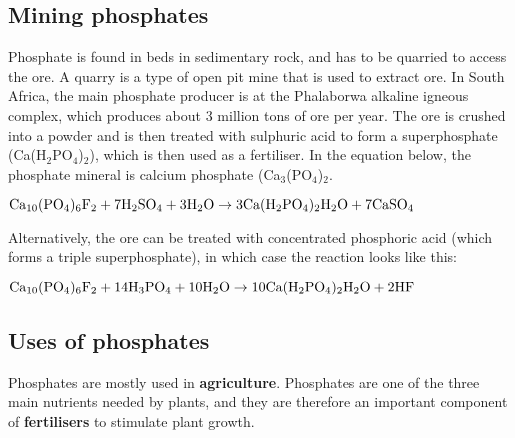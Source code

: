 \subsection{Mining phosphates}

Phosphate is found in beds in sedimentary rock, and has to be quarried to access the ore. A quarry is a type of open pit mine that is used to extract ore. In South Africa, the main phosphate producer is at the Phalaborwa alkaline igneous complex, which produces about 3 million tons of ore per year. The ore is crushed into a powder and is then treated with sulphuric acid to form a superphosphate (Ca(H$_{2}$PO$_{4}$)$_{2}$), which is then used as a fertiliser. In the equation below, the phosphate mineral is calcium phosphate (Ca$_{3}$(PO$_{4}$)$_{2}$.

\begin{center}
$\rm{Ca_{10}(PO_{4})_{6}F_{2} + 7H_{2}SO_{4} + 3H_{2}O \rightarrow 3Ca(H_{2}PO_{4})_{2}H_{2}O + 7CaSO_{4}}$
\end{center}

Alternatively, the ore can be treated with concentrated phosphoric acid (which forms a triple superphosphate), in which case the reaction looks like this:

\begin{center}
$\rm{Ca_{10}(PO_{4})_{6}F_{2} + 14H_{3}PO_{4} + 10H_{2}O \rightarrow 10Ca(H_{2}PO_{4})_{2}H_{2}O + 2HF}$
\end{center}

\subsection{Uses of phosphates}

Phosphates are mostly used in \textbf{agriculture}. Phosphates are one of the three main nutrients needed by plants, and they are therefore an important component of \textbf{fertilisers} to stimulate plant growth.

